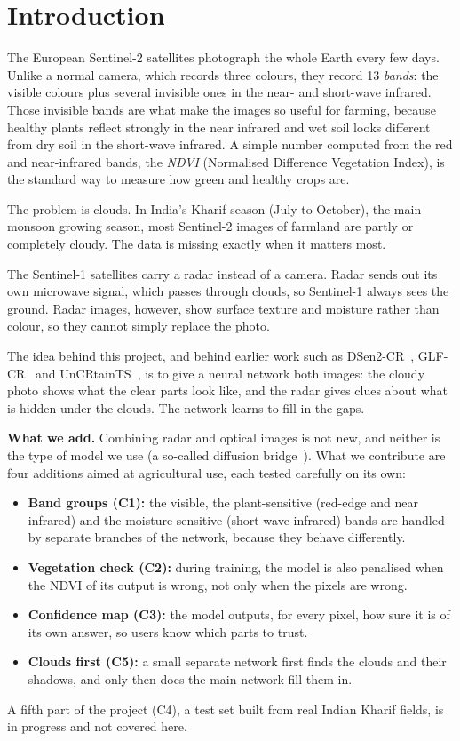 \documentclass[conference]{IEEEtran}
\begin{document}
\section{Introduction}
The European Sentinel-2 satellites photograph the whole Earth every few days. Unlike a normal
camera, which records three colours, they record 13 \emph{bands}: the visible colours plus
several invisible ones in the near- and short-wave infrared. Those invisible bands are what make
the images so useful for farming, because healthy plants reflect strongly in the near infrared
and wet soil looks different from dry soil in the short-wave infrared. A simple number computed
from the red and near-infrared bands, the \emph{NDVI} (Normalised Difference Vegetation Index),
is the standard way to measure how green and healthy crops are.

The problem is clouds. In India's Kharif season (July to October), the main monsoon growing
season, most Sentinel-2 images of farmland are partly or completely cloudy. The data is missing
exactly when it matters most.

The Sentinel-1 satellites carry a radar instead of a camera. Radar sends out its own microwave
signal, which passes through clouds, so Sentinel-1 always sees the ground. Radar images, however,
show surface texture and moisture rather than colour, so they cannot simply replace the photo.

The idea behind this project, and behind earlier work such as DSen2-CR~\cite{meraner2020dsen2cr},
GLF-CR~\cite{xu2022glfcr} and UnCRtainTS~\cite{ebel2023uncrtaints}, is to give a neural network
both images: the cloudy photo shows what the clear parts look like, and the radar gives clues
about what is hidden under the clouds. The network learns to fill in the gaps.

\textbf{What we add.} Combining radar and optical images is not new, and neither is the type of
model we use (a so-called diffusion bridge~\cite{hu2025dbcr}). What we contribute are four
additions aimed at agricultural use, each tested carefully on its own:
\begin{itemize}
\item \textbf{Band groups (C1):} the visible, the plant-sensitive (red-edge and near infrared) and
the moisture-sensitive (short-wave infrared) bands are handled by separate branches of the
network, because they behave differently.
\item \textbf{Vegetation check (C2):} during training, the model is also penalised when the NDVI of
its output is wrong, not only when the pixels are wrong.
\item \textbf{Confidence map (C3):} the model outputs, for every pixel, how sure it is of its own
answer, so users know which parts to trust.
\item \textbf{Clouds first (C5):} a small separate network first finds the clouds and their
shadows, and only then does the main network fill them in.
\end{itemize}
A fifth part of the project (C4), a test set built from real Indian Kharif fields, is in progress
and not covered here.
\end{document}

